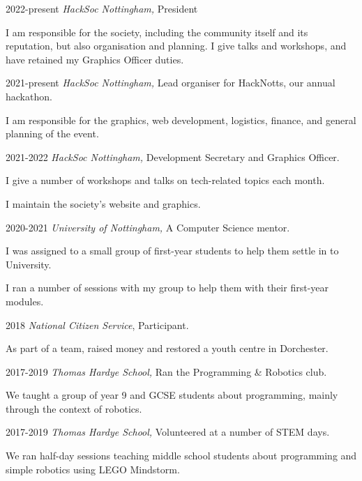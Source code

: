 \documentclass[12pt]{article}
\begin{document}
\begin{explist}
	\item[2022-present] \textit{HackSoc Nottingham,} President
	{\small \begin{explist}
		\item I am responsible for the society, including the community itself and its reputation, but also organisation and planning. I give talks and workshops, and have retained my Graphics Officer duties.
	\end{explist}}
	\item[2021-present] \textit{HackSoc Nottingham,} Lead organiser for HackNotts, our annual hackathon.
	{\small \begin{explist}
		\item I am responsible for the graphics, web development, logistics, finance, and general planning of the event.
	\end{explist}}
	\item[2021-2022] \textit{HackSoc Nottingham,} Development Secretary and Graphics Officer.
	{\small \begin{explist}
		\item I give a number of workshops and talks on tech-related topics each month.
		\item I maintain the society's website and graphics.
	\end{explist}}
	\item[2020-2021] \textit{University of Nottingham,} A Computer Science mentor.
	{\small \begin{explist}
		\item I was assigned to a small group of first-year students to help them settle in to University.
		\item I ran a number of sessions with my group to help them with their first-year modules.
	\end{explist}}
	\item[2018] \textit{National Citizen Service}, Participant.
	{\small \begin{explist}
		\item As part of a team, raised money and restored a youth centre in Dorchester.
	\end{explist}}
	\item[2017-2019] \textit{Thomas Hardye School,} Ran the Programming \& Robotics club.
	{\small \begin{explist}
		\item We taught a group of year 9 and GCSE students about programming, mainly through the context of robotics.
	\end{explist}}
	\item[2017-2019] \textit{Thomas Hardye School,} Volunteered at a number of STEM days.
	{\small \begin{explist}
		\item We ran half-day sessions teaching middle school students about programming and simple robotics using LEGO Mindstorm.
	\end{explist}}
\end{explist}
\end{document}
